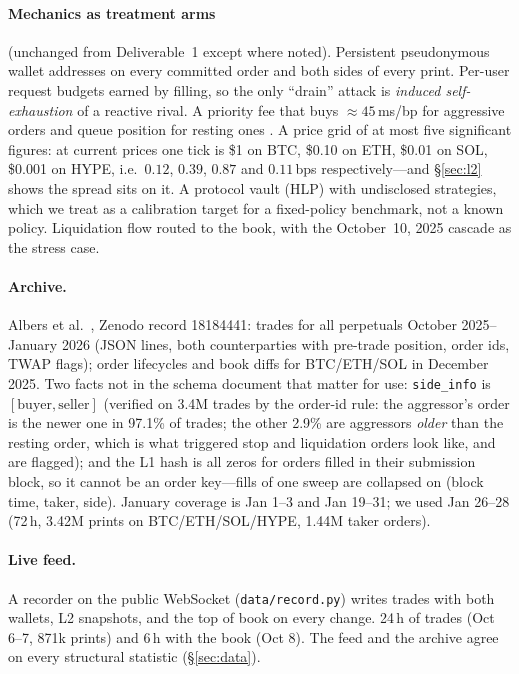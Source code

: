 \documentclass[11pt]{article}
\begin{document}
\paragraph{Mechanics as treatment arms} (unchanged from Deliverable~1 except where noted). Persistent pseudonymous wallet addresses on every committed order and both sides of every print. Per-user request budgets earned by filling, so the only ``drain'' attack is \emph{induced self-exhaustion} of a reactive rival. A priority fee that buys $\approx45$\,ms/bp for aggressive orders and queue position for resting ones \cite{hldocs}. A price grid of at most five significant figures: at current prices one tick is \$1 on BTC, \$0.10 on ETH, \$0.01 on SOL, \$0.001 on HYPE, i.e.\ $0.12$, $0.39$, $0.87$ and $0.11$\,bps respectively---and \S\ref{sec:l2} shows the spread sits on it. A protocol vault (HLP) with undisclosed strategies, which we treat as a calibration target for a fixed-policy benchmark, not a known policy. Liquidation flow routed to the book, with the October~10, 2025 cascade as the stress case.

\paragraph{Archive.} Albers et al.\ \cite{albers}, Zenodo record 18184441: trades for all perpetuals October 2025--January 2026 (JSON lines, both counterparties with pre-trade position, order ids, TWAP flags); order lifecycles and book diffs for BTC/ETH/SOL in December 2025. Two facts not in the schema document that matter for use: \texttt{side\_info} is $[\text{buyer},\text{seller}]$ (verified on 3.4M trades by the order-id rule: the aggressor's order is the newer one in 97.1\% of trades; the other 2.9\% are aggressors \emph{older} than the resting order, which is what triggered stop and liquidation orders look like, and are flagged); and the L1 hash is all zeros for orders filled in their submission block, so it cannot be an order key---fills of one sweep are collapsed on (block time, taker, side). January coverage is Jan 1--3 and Jan 19--31; we used Jan 26--28 (72\,h, 3.42M prints on BTC/ETH/SOL/HYPE, 1.44M taker orders).

\paragraph{Live feed.} A recorder on the public WebSocket (\texttt{data/record.py}) writes trades with both wallets, L2 snapshots, and the top of book on every change. 24\,h of trades (Oct 6--7, 871k prints) and 6\,h with the book (Oct 8). The feed and the archive agree on every structural statistic (\S\ref{sec:data}).
\end{document}
